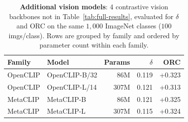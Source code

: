 \begin{table}[!htbp]
\caption{\textbf{Additional vision models}: 4 contrastive vision backbones not in Table~\ref{tab:full-results}, evaluated for $\delta$ and ORC on the same $1{,}000$ ImageNet classes ($100$ imgs/class). Rows are grouped by family and ordered by parameter count within each family.}
\label{tab:breadth-vision}
\centering\scriptsize
\begin{tabular}{llrrr}
\toprule
Family & Model & Params & $\delta$ & ORC \\
\midrule
OpenCLIP & OpenCLIP-B/32 & 86M & 0.119 & +0.323 \\
OpenCLIP & OpenCLIP-L/14 & 307M & 0.121 & +0.313 \\
\midrule
MetaCLIP & MetaCLIP-B & 86M & 0.121 & +0.325 \\
MetaCLIP & MetaCLIP-L & 307M & 0.115 & +0.324 \\
\bottomrule
\end{tabular}
\end{table}

